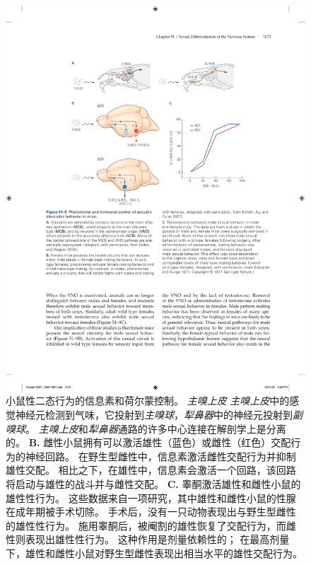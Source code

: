\begin{figure}[htbp]
	\centering
	\includegraphics[width=0.95\linewidth]{chap51/fig_51_9}
	\caption{小鼠性二态行为的信息素和荷尔蒙控制。
		\textit{主嗅上皮} \textit{主嗅上皮}中的感觉神经元检测到气味，它投射到\textit{主嗅球}，\textit{犁鼻器}中的神经元投射到\textit{副嗅球}。
		\textit{主嗅上皮}和\textit{犁鼻器}通路的许多中心连接在解剖学上是分离的\cite{dulac2006genetic}。
		\textbf{B.} 雌性小鼠拥有可以激活雄性（蓝色）或雌性（红色）交配行为的神经回路。
		在野生型雌性中，信息素激活雌性交配行为并抑制雄性交配。
		相比之下，在雄性中，信息素会激活一个回路，该回路将启动与雄性的战斗并与雌性交配\cite{kimchi2007functional}。
		\textbf{C.} 睾酮激活雄性和雌性小鼠的雄性性行为。
		这些数据来自一项研究，其中雄性和雌性小鼠的性腺在成年期被手术切除。
		手术后，没有一只动物表现出与野生型雌性的雄性性行为。
		施用睾酮后，被阉割的雄性恢复了交配行为，而雌性则表现出雄性性行为。
		这种作用是剂量依赖性的；
		在最高剂量下，雄性和雌性小鼠对野生型雌性表现出相当水平的雄性交配行为\cite{edwards1971early}。 }
	\label{fig:51_9}
\end{figure}


